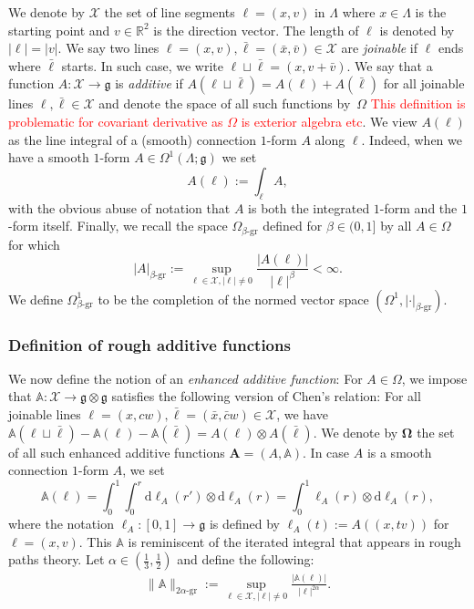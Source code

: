 \documentclass[12pt]{article}
\numberwithin{equation}{section}
\theoremstyle{definition}
\theoremstyle{remark}
\newcommand{\diff}{\mathrm{d}}
\newcommand{\R}{\mathbb R}
\newcommand{\1}{\mathbf 1}
\newcommand{\<}{\langle}
\renewcommand{\>}{\rangle}
\newcommand{\gr}{\text{-}\mathrm{gr}}
\newcommand{\red}[1]{\textcolor{red}{#1}}
\newcommand{\bfA}{\mathbf A}
\newcommand{\bA}{\mathbb A}
\newcommand{\bfOmega}{\boldsymbol{\Omega}}
\newcommand{\cX}{\mathcal X}
\newcommand{\fg}{\mathfrak g}
\begin{document}
%
%
We denote by $\cX$ the set of line segments $\ell=(x,v)$ in $\Lambda$ where $x\in \Lambda$ is the starting point and $v\in\R^2$ is the direction vector. The length of $\ell$ is denoted by $|\ell|=|v|$. 
%
We say two lines $\ell=(x,v),\bar\ell=(\bar x,\bar v)\in\cX$ are \emph{joinable} if $\ell$ ends where $\bar\ell$ starts. In such case, we write $\ell\sqcup\bar\ell=(x,v+\bar v)$. We say that a function $A:\cX\to \fg$ is \emph{additive} if $A(\ell\sqcup\bar\ell)=A(\ell)+A(\bar\ell)$ for all joinable lines $\ell,\bar\ell\in\cX$ and denote the space of all such functions by~$\Omega$ \red{This definition is problematic for covariant derivative as $\Omega$ is exterior algebra etc}.  
%
We view $A(\ell)$ as the line integral of a (smooth) connection $1$-form $A $ along $\ell$. Indeed, when we have a smooth $1$-form $A\in\Omega^1 (\Lambda;\fg)$ we set
\[
A(\ell):=\int_\ell A,
\]
with the obvious abuse of notation that $A$ is both the integrated $1$-form and the $1$-form itself. 
%
Finally, we recall the space $\Omega_{\beta\gr}$ defined for $\beta\in (0,1]$ by all $A\in\Omega$ for which
\[
|A|_{\beta\gr}:=\sup_{\ell\in\cX,|\ell|\neq 0}\frac{|A(\ell)|}{|\ell|^\beta}<\infty.
\]
We define $\Omega^1_{\beta\gr}$ to be the completion of the normed vector space $(\Omega^1,|\cdot|_{\beta\gr})$. 

\subsubsection{Definition of rough additive functions}
%
We now define the notion of an \emph{enhanced additive function}: 
%
For $A\in\Omega$, we impose that  $\bA:\cX\to \fg\otimes \fg$ satisfies the following version of Chen's relation: 
%
For all joinable lines $\ell=(x,cw),\bar\ell=(\bar x,\bar cw)\in\cX$, we have $\bA(\ell\sqcup \bar\ell)-\bA(\ell)-\bA(\bar\ell)=A(\ell)\otimes A(\bar \ell)$.
We denote by $\bfOmega$ the set of all such enhanced additive functions $\bfA=(A,\bA)$.  In case $A$ is a smooth connection $1$-form $A$, we set
%
$$\bA(\ell)=\int^1_0\int^r_0 \diff\ell_A(r') \otimes\diff\ell_A(r)=\int^1_0\ell_A(r)\otimes\diff\ell_A(r),$$
%
where the notation $\ell_A:[0,1]\to\fg$ is defined by $\ell_A(t):=A((x,tv))$ for $\ell=(x,v)$. This $\bA$ is reminiscent of the iterated integral that appears in rough paths theory. 
%
Let $\alpha\in (\frac 13,\frac 12)$ and define the following:
\begin{align}
\|\bA\|_{2\alpha\gr}:=\sup_{\ell\in\cX,|\ell|\neq 0}\frac{|\bA(\ell)|}{|\ell|^{2\alpha}}. 
\end{align}
\end{document}
